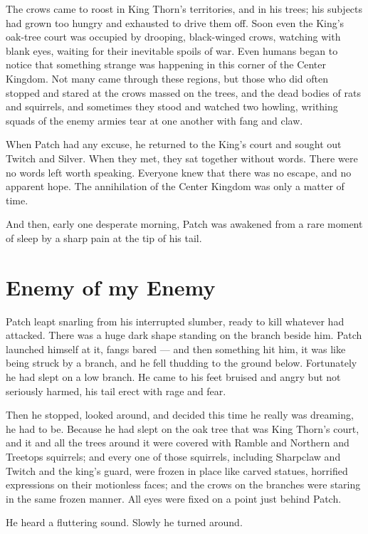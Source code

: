 \documentclass[12pt]{book}
\begin{document}
The crows came to roost in King Thorn's territories, and in his trees; his subjects had grown too hungry and exhausted to drive them off. Soon even the King's oak-tree court was occupied by drooping, black-winged crows, watching with blank eyes, waiting for their inevitable spoils of war. Even humans began to notice that something strange was happening in this corner of the Center Kingdom. Not many came through these regions, but those who did often stopped and stared at the crows massed on the trees, and the dead bodies of rats and squirrels, and sometimes they stood and watched two howling, writhing squads of the enemy armies tear at one another with fang and claw.

When Patch had any excuse, he returned to the King's court and sought out Twitch and Silver. When they met, they sat together without words. There were no words left worth speaking. Everyone knew that there was no escape, and no apparent hope. The annihilation of the Center Kingdom was only a matter of time.

And then, early one desperate morning, Patch was awakened from a rare moment of sleep by a sharp pain at the tip of his tail.


\section{Enemy of my Enemy}

Patch leapt snarling from his interrupted slumber, ready to kill whatever had attacked. There was a huge dark shape standing on the branch beside him. Patch launched himself at it, fangs bared ---
and then something hit him, it was like being struck by a branch, and he fell thudding to the ground below. Fortunately he had slept on a low branch. He came to his feet bruised and angry but not seriously harmed, his tail erect with rage and fear.

Then he stopped, looked around, and decided this time he really was dreaming, he had to be. Because he had slept on the oak tree that was King Thorn's court, and it and all the trees around it were covered with Ramble and Northern and Treetops squirrels; and every one of those squirrels, including Sharpclaw and Twitch and the king's guard, were frozen in place like carved statues, horrified expressions on their motionless faces; and the crows on the branches were staring in the same frozen manner. All eyes were fixed on a point just behind Patch.

He heard a fluttering sound. Slowly he turned around.
\end{document}

